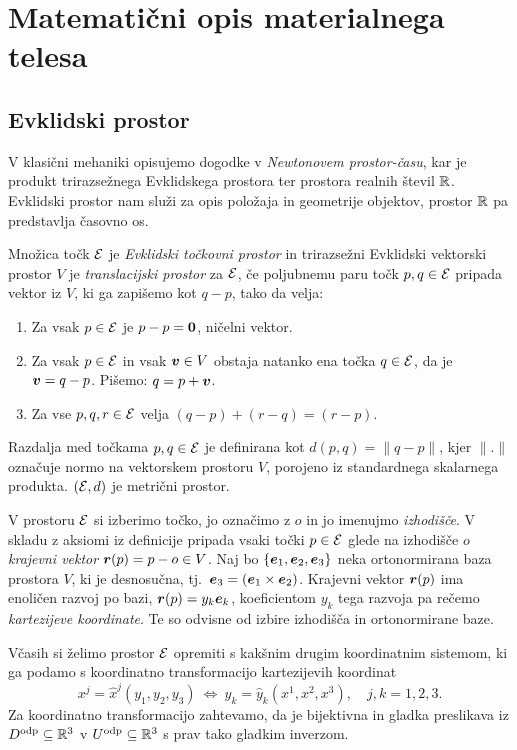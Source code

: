 \chapter{Matematični opis materialnega telesa}


\section{Evklidski prostor}


V klasični mehaniki opisujemo dogodke v \emph{Newtonovem prostor-času}, kar je produkt
trirazsežnega Evklidskega prostora ter prostora realnih števil $\mathbb R$. Evklidski prostor nam služi
za opis položaja in geometrije objektov, prostor $\mathbb R$ pa predstavlja časovno os.

\begin{definicija} \label{d:ep}
	Množica točk $\mathcal E$ je \emph{Evklidski točkovni prostor} in trirazsežni Evklidski vektorski prostor $V$ je
	\emph{translacijski prostor} za $\mathcal E$, če poljubnemu paru točk $p,q\in\mathcal E$ pripada vektor iz $V$,
	ki ga zapišemo kot $q-p$, tako da velja:
	\begin{enumerate}
		\item Za vsak $p\in\mathcal E$ je $p-p=\boldsymbol 0$, ničelni vektor.
		\item Za vsak $p\in\mathcal E$ in vsak $\boldsymbol v\in V$ obstaja natanko ena točka $q\in\mathcal E$, da je
		$\boldsymbol v=q-p$. Pišemo: $q=p+\boldsymbol v$.
		\item Za vse $p,q,r\in\mathcal E$ velja $(q-p)+(r-q)=(r-p)$.
	\end{enumerate}
\end{definicija}

Razdalja med točkama $p,q\in\mathcal E$ je definirana kot $d(p,q)=\|q-p\|$, kjer $\|.\|$ označuje normo na
vektorskem prostoru $V$, porojeno iz standardnega skalarnega produkta. $(\mathcal E,d)$ je metrični prostor.

V prostoru $\mathcal E$ si izberimo točko, jo označimo z $o$ in jo imenujmo \emph{izhodišče}.
V skladu z aksiomi iz definicije pripada vsaki točki $p\in\mathcal E$ glede na izhodišče $o$ \emph{krajevni vektor}
$\boldsymbol r(p)=p-o\in V$. Naj bo $\{\boldsymbol e_1,\boldsymbol e_2,\boldsymbol e_3\}$ neka ortonormirana baza prostora $V$,
ki je desnosučna, tj.~$\boldsymbol e_3=(\boldsymbol e_1\times\boldsymbol e_2)$. Krajevni vektor $\boldsymbol r(p)$
ima enoličen razvoj po bazi, $\boldsymbol r(p)=y_k\boldsymbol e_k$, koeficientom $y_k$ tega razvoja pa rečemo
\emph{kartezijeve koordinate}. Te so odvisne od izbire izhodišča in ortonormirane baze.

Včasih si želimo prostor $\mathcal E$ opremiti s kakšnim drugim koordinatnim sistemom, ki ga podamo
s koordinatno transformacijo kartezijevih koordinat
\begin{equation}\label{e:kt}
	x^j = \hat{x}^j(y_1,y_2,y_3) \ \Leftrightarrow \ y_k=\hat{y}_k(x^1,x^2,x^3), \quad j,k=1,2,3.
\end{equation}
Za koordinatno transformacijo zahtevamo, da je bijektivna in gladka preslikava iz
$D^{\mathrm{odp}}\subseteq\mathbb R^3$ v $U^{\mathrm{odp}}\subseteq\mathbb R^3$ s prav tako gladkim inverzom.

